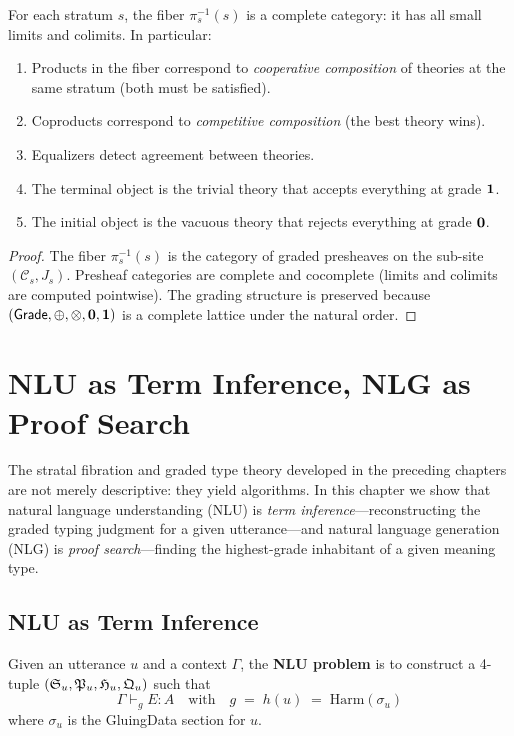 \begin{proposition}
\label{prop:fiber-complete}
For each stratum $s$, the fiber $\pi_s^{-1}(s)$ is a complete
category: it has all small limits and colimits.  In particular:
\begin{enumerate}[label=(\roman*)]
\item Products in the fiber correspond to \emph{cooperative
  composition} of theories at the same stratum (both must be
  satisfied).
\item Coproducts correspond to \emph{competitive composition}
  (the best theory wins).
\item Equalizers detect agreement between theories.
\item The terminal object is the trivial theory that accepts
  everything at grade $\mathbf{1}$.
\item The initial object is the vacuous theory that rejects
  everything at grade $\mathbf{0}$.
\end{enumerate}
\end{proposition}

\begin{proof}
The fiber $\pi_s^{-1}(s)$ is the category of graded presheaves on
the sub-site $(\mathcal{C}_s, J_s)$.  Presheaf categories are
complete and cocomplete (limits and colimits are computed
pointwise).  The grading structure is preserved because
$(\mathsf{Grade}, \oplus, \otimes, \mathbf{0}, \mathbf{1})$ is a complete lattice under
the natural order.
\end{proof}

\chapter{NLU as Term Inference, NLG as Proof Search}
\label{ch:nlu-nlg}

The stratal fibration and graded type theory developed in the
preceding chapters are not merely descriptive: they yield algorithms.
In this chapter we show that natural language understanding (NLU) is
\emph{term inference}---reconstructing the graded typing judgment
for a given utterance---and natural language generation (NLG) is
\emph{proof search}---finding the highest-grade inhabitant of a
given meaning type.

\section{NLU as Term Inference}
\label{sec:nlu}

\begin{definition}
\label{def:nlu-problem}
Given an utterance $u$ and a context $\Gamma$, the \textbf{NLU
problem} is to construct a 4-tuple $(\mathfrak{S}_u, \mathfrak{P}_u, \mathfrak{H}_u,
\mathfrak{Q}_u)$ such that
\[
  \Gamma \vdash_g E : A
  \quad\text{with}\quad
  g \;=\; h(u) \;=\; \mathrm{Harm}(\sigma_u)
\]
where $\sigma_u$ is the GluingData section for $u$.
\end{definition}

